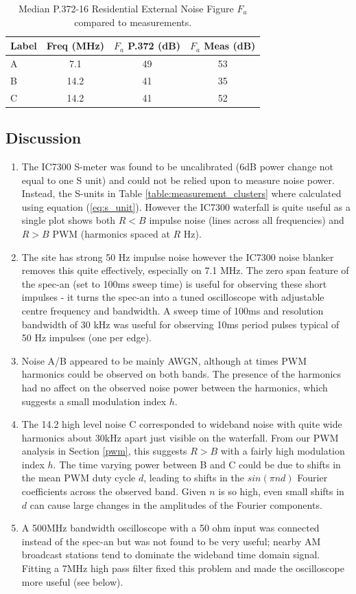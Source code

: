 \documentclass{article}
\begin{document}
\begin{table}[h]
\centering
\begin{tabular}{l c c c}
 \hline
 Label & Freq (MHz) & $F_a$ P.372 (dB) & $F_a$ Meas (dB) \\
 \hline
 A & 7.1  & 49 & 53 \\
 B & 14.2 & 41 & 35 \\
 C & 14.2 & 41 & 52 \\
\end{tabular}
\caption{Median P.372-16 Residential External Noise Figure $F_a$ compared to measurements.}
\label{table:external_noise_figure}
\end{table}

\subsection{Discussion}

\begin{enumerate}
\item The IC7300 S-meter was found to be uncalibrated \cite{vu2nsb_s_meter} (6dB power change not equal to one S unit) and could not be relied upon to measure noise power.  Instead, the S-units in Table \ref{table:measurement_clusters} where calculated using equation (\ref{eq:s_unit}). However the IC7300 waterfall is quite useful as a single plot shows both $R<B$ impulse noise (lines across all frequencies) and $R>B$ PWM (harmonics spaced at $R$ Hz).
\item The site has strong 50 Hz impulse noise however the IC7300 noise blanker removes this quite effectively, especially on 7.1 MHz.  The zero span feature of the spec-an (set to 100ms sweep time) is useful for observing these short impulses - it turns the spec-an into a tuned oscilloscope with adjustable centre frequency and bandwidth.  A sweep time of 100ms and resolution bandwidth of 30 kHz was useful for observing 10ms period pulses typical of 50 Hz impulses (one per edge).
\item Noise A/B appeared to be mainly AWGN, although at times PWM harmonics could be observed on both bands. The presence of the harmonics had no affect on the observed noise power between the harmonics, which suggests a small modulation index $h$.
\item The 14.2 high level noise C corresponded to wideband noise with quite wide harmonics about 30kHz apart just visible on the waterfall.  From our PWM analysis in Section \ref{pwm}, this suggests $R>B$ with a fairly high modulation index $h$.  The time varying power between B and C could be due to shifts in the mean PWM duty cycle $d$, leading to shifts in the $sin(\pi n d)$ Fourier coefficients across the observed band.  Given $n$ is so high, even small shifts in $d$ can cause large changes in the amplitudes of the Fourier components.
\item A 500MHz bandwidth oscilloscope with a 50 ohm input was connected instead of the spec-an but was not found to be very useful; nearby AM broadcast stations tend to dominate the wideband time domain signal.  Fitting a 7MHz high pass filter fixed this problem and made the oscilloscope more useful (see below). 
\end{enumerate}
\end{document}
